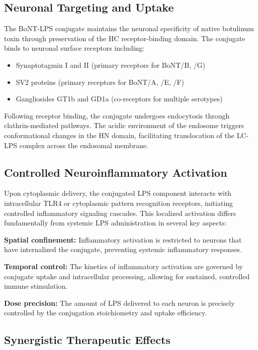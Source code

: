 \documentclass[11pt,a4paper]{article}
\begin{document}
\subsection{Neuronal Targeting and Uptake}

The BoNT-LPS conjugate maintains the neuronal specificity of native botulinum toxin through preservation of the HC receptor-binding domain. The conjugate binds to neuronal surface receptors including:

\begin{itemize}
\item Synaptotagmin I and II (primary receptors for BoNT/B, /G)
\item SV2 proteins (primary receptors for BoNT/A, /E, /F)
\item Gangliosides GT1b and GD1a (co-receptors for multiple serotypes)
\end{itemize}

Following receptor binding, the conjugate undergoes endocytosis through clathrin-mediated pathways. The acidic environment of the endosome triggers conformational changes in the HN domain, facilitating translocation of the LC-LPS complex across the endosomal membrane.

\subsection{Controlled Neuroinflammatory Activation}

Upon cytoplasmic delivery, the conjugated LPS component interacts with intracellular TLR4 or cytoplasmic pattern recognition receptors, initiating controlled inflammatory signaling cascades. This localized activation differs fundamentally from systemic LPS administration in several key aspects:

\textbf{Spatial confinement:} Inflammatory activation is restricted to neurons that have internalized the conjugate, preventing systemic inflammatory responses.

\textbf{Temporal control:} The kinetics of inflammatory activation are governed by conjugate uptake and intracellular processing, allowing for sustained, controlled immune stimulation.

\textbf{Dose precision:} The amount of LPS delivered to each neuron is precisely controlled by the conjugation stoichiometry and uptake efficiency.

\subsection{Synergistic Therapeutic Effects}
\end{document}
